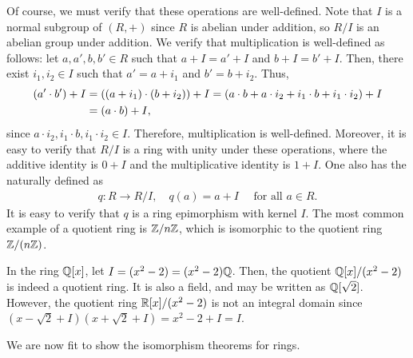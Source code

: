 Of course, we must verify that these operations are well-defined. Note that $I$ is a normal subgroup of $(R, +)$ since $R$ is abelian under addition, so $R/I$ is an abelian group under addition. We verify that multiplication is well-defined as follows: let $a, a', b, b' \in R$ such that $a + I = a' + I$ and $b + I = b' + I$. Then, there exist $i_{1}, i_{2} \in I$ such that $a' = a + i_{1}$ and $b' = b + i_{2}$. Thus,
\begin{align}
    (a' \cdot b') + I &= ((a + i_{1}) \cdot (b + i_{2})) + I = (a \cdot b + a \cdot i_{2} + i_{1} \cdot b + i_{1} \cdot i_{2}) + I \notag \\
    &= (a \cdot b) + I,
\end{align}
since $a \cdot i_{2}, i_{1} \cdot b, i_{1} \cdot i_{2} \in I$. Therefore, multiplication is well-defined. Moreover, it is easy to verify that $R/I$ is a ring with unity under these operations, where the additive identity is $0 + I$ and the multiplicative identity is $1 + I$. One also has the  naturally defined as
\begin{align}
    q:R \to R/I, \quad q(a) = a + I \quad \text{ for all } a \in R.
\end{align}
It is easy to verify that $q$ is a ring epimorphism with kernel $I$. The most common example of a quotient ring is $\mathbb{Z}/n\mathbb{Z}$, which is isomorphic to the quotient ring $\mathbb{Z}/(n\mathbb{Z})$.

\begin{example}
    In the ring $\mathbb{Q}[x]$, let $I = (x^{2}-2) = (x^{2}-2)\mathbb{Q}$. Then, the quotient $\mathbb{Q}[x]/(x^{2}-2)$ is indeed a quotient ring. It is also a field, and may be written as $\mathbb{Q}[\sqrt{2}]$. However, the quotient ring $\mathbb{R}[x]/(x^{2}-2)$ is not an integral domain since $(x- \sqrt{2} + I)(x + \sqrt{2} + I) = x^{2} - 2 + I = I$.
\end{example}

We are now fit to show the isomorphism theorems for rings.


